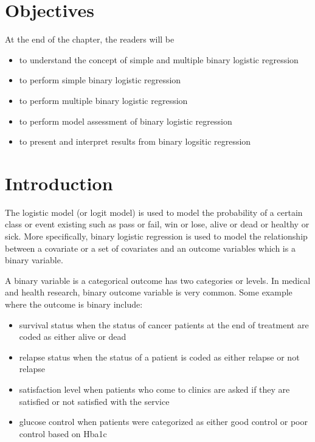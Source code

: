 \documentclass[
  10pt,
]{krantz}
\providecommand{\tightlist}{%
  \setlength{\itemsep}{0pt}\setlength{\parskip}{0pt}}
\begin{document}
\hypertarget{objectives-6}{%
\section{Objectives}\label{objectives-6}}

At the end of the chapter, the readers will be

\begin{itemize}
\tightlist
\item
  to understand the concept of simple and multiple binary logistic regression
\item
  to perform simple binary logistic regression
\item
  to perform multiple binary logistic regression
\item
  to perform model assessment of binary logistic regression
\item
  to present and interpret results from binary logsitic regression
\end{itemize}

\hypertarget{introduction-3}{%
\section{Introduction}\label{introduction-3}}

The logistic model (or logit model) is used to model the probability of a certain class or event existing such as pass or fail, win or lose, alive or dead or healthy or sick. More specifically, binary logistic regression is used to model the relationship between a covariate or a set of covariates and an outcome variables which is a binary variable.

A binary variable is a categorical outcome has two categories or levels. In medical and health research, binary outcome variable is very common. Some example where the outcome is binary include:

\begin{itemize}
\tightlist
\item
  survival status when the status of cancer patients at the end of treatment are coded as either alive or dead
\item
  relapse status when the status of a patient is coded as either relapse or not relapse
\item
  satisfaction level when patients who come to clinics are asked if they are satisfied or not satisfied with the service
\item
  glucose control when patients were categorized as either good control or poor control based on Hba1c
\end{itemize}
\end{document}
